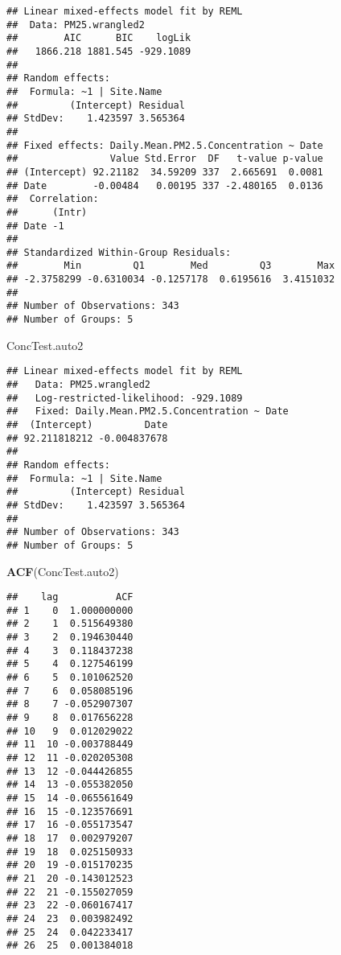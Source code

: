 \documentclass[]{article}
\newenvironment{Shaded}{\begin{snugshade}}{\end{snugshade}}
\newcommand{\KeywordTok}[1]{\textcolor[rgb]{0.13,0.29,0.53}{\textbf{#1}}}
\newcommand{\NormalTok}[1]{#1}
\begin{document}
\begin{verbatim}
## Linear mixed-effects model fit by REML
##  Data: PM25.wrangled2 
##        AIC      BIC    logLik
##   1866.218 1881.545 -929.1089
## 
## Random effects:
##  Formula: ~1 | Site.Name
##         (Intercept) Residual
## StdDev:    1.423597 3.565364
## 
## Fixed effects: Daily.Mean.PM2.5.Concentration ~ Date 
##                Value Std.Error  DF   t-value p-value
## (Intercept) 92.21182  34.59209 337  2.665691  0.0081
## Date        -0.00484   0.00195 337 -2.480165  0.0136
##  Correlation: 
##      (Intr)
## Date -1    
## 
## Standardized Within-Group Residuals:
##        Min         Q1        Med         Q3        Max 
## -2.3758299 -0.6310034 -0.1257178  0.6195616  3.4151032 
## 
## Number of Observations: 343
## Number of Groups: 5
\end{verbatim}

\begin{Shaded}
\begin{Highlighting}[]
\NormalTok{ConcTest.auto2}
\end{Highlighting}
\end{Shaded}

\begin{verbatim}
## Linear mixed-effects model fit by REML
##   Data: PM25.wrangled2 
##   Log-restricted-likelihood: -929.1089
##   Fixed: Daily.Mean.PM2.5.Concentration ~ Date 
##  (Intercept)         Date 
## 92.211818212 -0.004837678 
## 
## Random effects:
##  Formula: ~1 | Site.Name
##         (Intercept) Residual
## StdDev:    1.423597 3.565364
## 
## Number of Observations: 343
## Number of Groups: 5
\end{verbatim}

\begin{Shaded}
\begin{Highlighting}[]
\KeywordTok{ACF}\NormalTok{(ConcTest.auto2)}
\end{Highlighting}
\end{Shaded}

\begin{verbatim}
##    lag          ACF
## 1    0  1.000000000
## 2    1  0.515649380
## 3    2  0.194630440
## 4    3  0.118437238
## 5    4  0.127546199
## 6    5  0.101062520
## 7    6  0.058085196
## 8    7 -0.052907307
## 9    8  0.017656228
## 10   9  0.012029022
## 11  10 -0.003788449
## 12  11 -0.020205308
## 13  12 -0.044426855
## 14  13 -0.055382050
## 15  14 -0.065561649
## 16  15 -0.123576691
## 17  16 -0.055173547
## 18  17  0.002979207
## 19  18  0.025150933
## 20  19 -0.015170235
## 21  20 -0.143012523
## 22  21 -0.155027059
## 23  22 -0.060167417
## 24  23  0.003982492
## 25  24  0.042233417
## 26  25  0.001384018
\end{verbatim}
\end{document}
